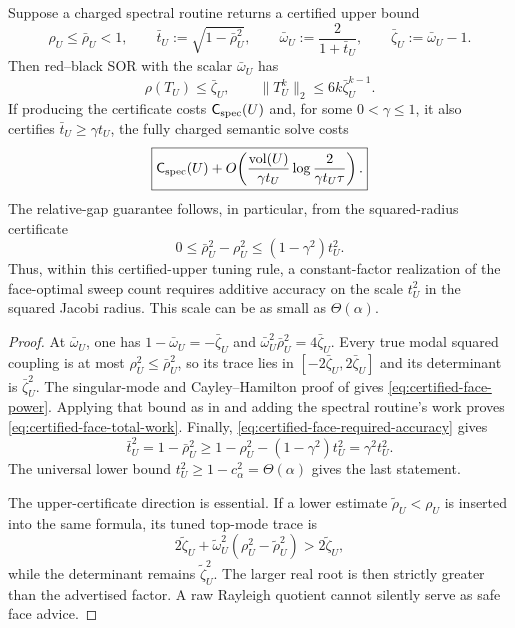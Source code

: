 \begin{proposition}
\label{prop:certified-face-spectral-cost}
Suppose a charged spectral routine returns a certified upper bound
\begin{equation}
 \rho_U\le \bar\rho_U<1,
 \qquad
 \bar t_U:=\sqrt{1-\bar\rho_U^2},
 \qquad
 \bar\omega_U:=\frac2{1+\bar t_U},
 \qquad
 \bar\zeta_U:=\bar\omega_U-1.
 \label{eq:certified-face-advice}
\end{equation}
Then red--black SOR with the scalar $\bar\omega_U$ has
\begin{equation}
 \rho(T_U)\le\bar\zeta_U,
 \qquad
 \|T_U^k\|_2\le6k\bar\zeta_U^{k-1}.
 \label{eq:certified-face-power}
\end{equation}
If producing the certificate costs $\mathsf C_{\rm spec}(U)$ and, for some
$0<\gamma\le1$, it also certifies $\bar t_U\ge\gamma t_U$, the fully charged
semantic solve costs
\begin{equation}
 \boxed{
 \mathsf C_{\rm spec}(U)
 +O\!\left(
  \frac{\operatorname{vol}(U)}{\gamma t_U}
  \log\frac{2}{\gamma t_U\tau}
 \right).}
 \label{eq:certified-face-total-work}
\end{equation}
The relative-gap guarantee follows, in particular, from the squared-radius
certificate
\begin{equation}
 0\le\bar\rho_U^2-\rho_U^2
 \le(1-\gamma^2)t_U^2.
 \label{eq:certified-face-required-accuracy}
\end{equation}
Thus, within this certified-upper tuning rule, a constant-factor realization
of the face-optimal sweep count requires additive accuracy on the scale
$t_U^2$ in the squared Jacobi radius.  This scale can be as small as
$\Theta(\alpha)$.
\end{proposition}

\begin{proof}
At $\bar\omega_U$, one has
$1-\bar\omega_U=-\bar\zeta_U$ and
$\bar\omega_U^2\bar\rho_U^2=4\bar\zeta_U$.  Every true modal squared coupling
is at most $\rho_U^2\le\bar\rho_U^2$, so its trace lies in
$[-2\bar\zeta_U,2\bar\zeta_U]$ and its determinant is
$\bar\zeta_U^2$.  The singular-mode and Cayley--Hamilton proof of
 gives
\eqref{eq:certified-face-power}.  Applying that bound as in
 and adding the spectral routine's work
proves \eqref{eq:certified-face-total-work}.  Finally,
\eqref{eq:certified-face-required-accuracy} gives
\[
 \bar t_U^2=1-\bar\rho_U^2
 \ge 1-\rho_U^2-(1-\gamma^2)t_U^2
 =\gamma^2t_U^2.
\]
The universal lower bound $t_U^2\ge1-c_\alpha^2=\Theta(\alpha)$ gives the
last statement.

The upper-certificate direction is essential.  If a lower estimate
$\widetilde\rho_U<\rho_U$ is inserted into the same formula, its tuned top-mode
trace is
\[
 2\widetilde\zeta_U
 +\widetilde\omega_U^2
   (\rho_U^2-\widetilde\rho_U^2)
 >2\widetilde\zeta_U,
\]
while the determinant remains $\widetilde\zeta_U^2$.  The larger real root is
then strictly greater than the advertised factor.  A raw Rayleigh quotient
cannot silently serve as safe face advice.
\end{proof}

